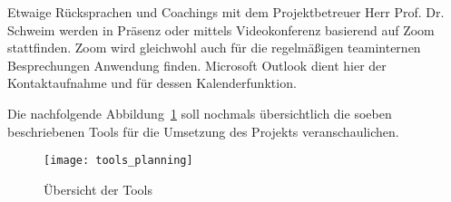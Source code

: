 Etwaige Rücksprachen und Coachings mit dem Projektbetreuer Herr Prof. Dr. Schweim werden in Präsenz oder mittels Videokonferenz basierend auf Zoom stattfinden.
Zoom wird gleichwohl auch für die regelmäßigen teaminternen Besprechungen Anwendung finden.
Microsoft Outlook dient hier der Kontaktaufnahme und für dessen Kalenderfunktion.

Die nachfolgende Abbildung~\ref{fig:uebersicht-tools} soll nochmals übersichtlich die soeben beschriebenen Tools für die Umsetzung des Projekts veranschaulichen.

\begin{figure}[H]
    \centering
    \texttt{[image: tools\_planning]}
    \caption{Übersicht der Tools}\label{fig:uebersicht-tools}
\end{figure}
